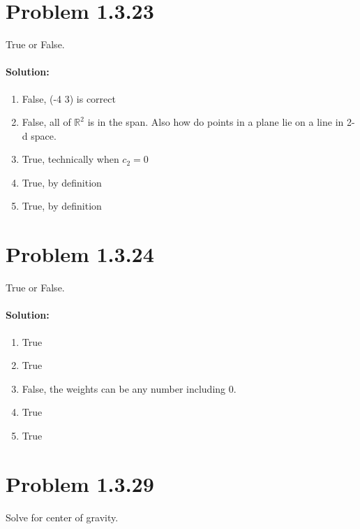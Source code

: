 \documentclass[11pt, notitlepage]{report}
\newcommand{\R}{\mathbb{R}}
\newenvironment{solution}{\paragraph{Solution:}}{\hfill}
\begin{document}
\newpage
\section{Problem 1.3.23}

True or False.

\begin{solution}
\begin{enumerate}[label=\alph*)]
	\item False, (-4 3) is correct
	\item False, all of $\R^2$ is in the span. Also how do points in a plane lie on a line in 2-d space.
	\item True, technically when $c_2 = 0$
	\item True, by definition
	\item True, by definition
\end{enumerate}
\end{solution}

\section{Problem 1.3.24}

True or False.

\begin{solution}
\begin{enumerate}[label=\alph*)]
	\item True
	\item True
	\item False, the weights can be any number including 0.
	\item True
	\item True
\end{enumerate}
\end{solution}

\section{Problem 1.3.29}

Solve for center of gravity.
\end{document}
